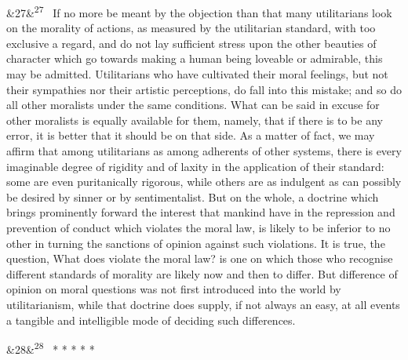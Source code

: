 \documentclass[12pt]{article}
\newcommand{\para}[1][]{\par\noindent\ifx&#1&\else\textsuperscript{\footnotesize #1}~\fi}
\begin{document}
\para[27] If no more be meant by the objection than that many utilitarians look on the morality of actions, as measured by the utilitarian standard, with too exclusive a regard, and do not lay sufficient stress upon the other beauties of character which go towards making a human being loveable or admirable, this may be admitted. Utilitarians who have cultivated their moral feelings, but not their sympathies nor their artistic perceptions, do fall into this mistake; and so do all other moralists under the same conditions. What can be said in excuse for other moralists is equally available for them, namely, that if there is to be any error, it is better that it should be on that side. As a matter of fact, we may affirm that among utilitarians as among adherents of other systems, there is every imaginable degree of rigidity and of laxity in the application of their standard: some are even puritanically rigorous, while others are as indulgent as can possibly be desired by sinner or by sentimentalist. But on the whole, a doctrine which brings prominently forward the interest that mankind have in the repression and prevention of conduct which violates the moral law, is likely to be inferior to no other in turning the sanctions of opinion against such violations. It is true, the question, What does violate the moral law? is one on which those who recognise different standards of morality are likely now and then to differ. But difference of opinion on moral questions was not first introduced into the world by utilitarianism, while that doctrine does supply, if not always an easy, at all events a tangible and intelligible mode of deciding such differences.

\para[28] * * * * *
\end{document}
